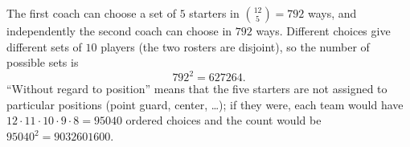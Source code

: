 The first coach can choose a set of $5$ starters in $\binom{12}{5}=792$ ways, and independently the second coach can choose in $792$ ways. Different choices give different sets of $10$ players (the two rosters are disjoint), so the number of possible sets is
\[
792^2=\boxed{627264}.
\]
``Without regard to position'' means that the five starters are not assigned to particular positions (point guard, center, \dots); if they were, each team would have $12\cdot11\cdot10\cdot9\cdot8=95040$ ordered choices and the count would be $95040^2=9032601600$.
